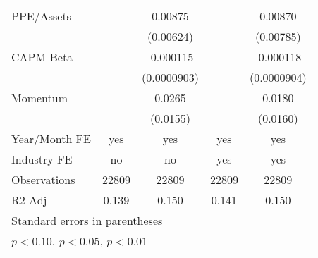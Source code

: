 {\begin{tabular}{l*{4}{c}}
PPE/Assets          &                     &     0.00875         &                     &     0.00870         \\
                    &                     &   (0.00624)         &                     &   (0.00785)         \\
CAPM Beta           &                     &   -0.000115         &                     &   -0.000118         \\
                    &                     & (0.0000903)         &                     & (0.0000904)         \\
Momentum            &                     &      0.0265\sym{*}  &                     &      0.0180         \\
                    &                     &    (0.0155)         &                     &    (0.0160)         \\
\hline
Year/Month FE       &         yes         &         yes         &         yes         &         yes         \\
Industry FE         &          no         &          no         &         yes         &         yes         \\
Observations        &       22809         &       22809         &       22809         &       22809         \\
R2-Adj              &       0.139         &       0.150         &       0.141         &       0.150         \\
\hline\hline
\multicolumn{5}{l}{\footnotesize Standard errors in parentheses}\\
\multicolumn{5}{l}{\footnotesize \sym{*} \(p<0.10\), \sym{**} \(p<0.05\), \sym{***} \(p<0.01\)}\\
\end{tabular}
}

